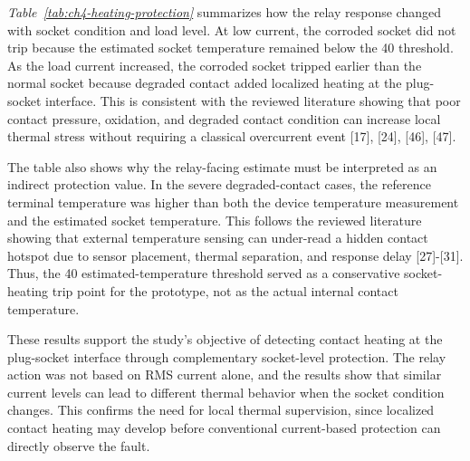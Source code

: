 \textit{Table~\ref{tab:ch4-heating-protection}} summarizes how the relay
response changed with socket condition and load level. At low current, the
corroded socket did not trip because the estimated socket temperature remained
below the 40{\degreeC} threshold. As the load current increased, the corroded
socket tripped earlier than the normal socket because degraded contact added
localized heating at the plug-socket interface. This is consistent with the
reviewed literature showing that poor contact pressure, oxidation, and degraded
contact condition can increase local thermal stress without requiring a
classical overcurrent event [17], [24], [46], [47].

The table also shows why the relay-facing estimate must be interpreted as an
indirect protection value. In the severe degraded-contact cases, the reference
terminal temperature was higher than both the device temperature measurement and
the estimated socket temperature. This follows the reviewed literature showing
that external temperature sensing can under-read a hidden contact hotspot due to
sensor placement, thermal separation, and response delay [27]-[31]. Thus, the
40{\degreeC} estimated-temperature threshold served as a conservative
socket-heating trip point for the prototype, not as the actual internal contact
temperature.

These results support the study's objective of detecting contact heating at the
plug-socket interface through complementary socket-level protection. The relay
action was not based on RMS current alone, and the results show that similar
current levels can lead to different thermal behavior when the socket condition
changes. This confirms the need for local thermal supervision, since localized
contact heating may develop before conventional current-based protection can
directly observe the fault.